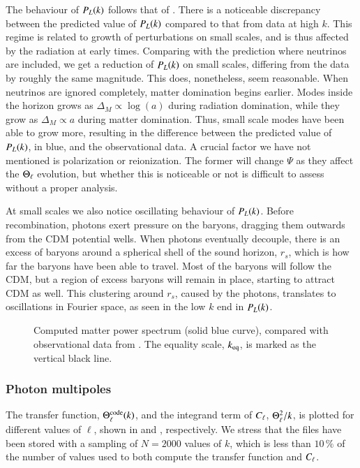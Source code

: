 The behaviour of $P_L(k)$ follows that of . There is a noticeable discrepancy between the predicted value of $P_L(k)$ compared to that from data at high $k$. This regime is related to growth of perturbations on small scales, and is thus affected by the radiation at early times. Comparing with the prediction where neutrinos are included, we get a reduction of $P_L(k)$ on small scales, differing from the data by roughly the same magnitude. This does, nonetheless, seem reasonable. When neutrinos are ignored completely, matter domination begins earlier. Modes inside the horizon grows as $\Delta_M\propto\log(a)$ during radiation domination, while they grow as $\Delta_M\propto a$ during matter domination. Thus, small scale modes have been able to grow more, resulting in the difference between the predicted value of $P_L(k)$, in blue, and the observational data. A crucial factor we have not mentioned is polarization or reionization. The former will change $\Psi$ as they affect the $\Theta_\ell$ evolution, but whether this is noticeable or not is difficult to assess without a proper analysis.

At small scales we also notice oscillating behaviour of $P_L(k)$. Before recombination, photons exert pressure on the baryons, dragging them outwards from the CDM potential wells. When photons eventually decouple, there is an excess of baryons around a spherical shell of the sound horizon, $r_s$, which is how far the baryons have been able to travel. Most of the baryons will follow the CDM, but a region of excess baryons will remain in place, starting to attract CDM as well. This clustering around $r_s$, caused by the photons, translates to oscillations in Fourier space, as seen in the low $k$ end in $P_L(k)$. 
\begin{figure}[ht!]
    \caption{Computed matter power spectrum (solid blue curve), compared with observational data from . The equality scale, $k_\mathrm{eq}$, is marked as the vertical black line.}
    \label{fig:M4:results:matterPS_nk2000Neff}
\end{figure}





\subsubsection{Photon multipoles} \label{sssec:M4:results:photons_multipoles}
The transfer function, $\Theta_\ell^\mathrm{code}(k)$, and the integrand term of $C_\ell$, $\Theta_\ell^2/k$, is plotted for different values of $\ell$, shown in  and , respectively. We stress that the files have been stored with a sampling of $N=2000$ values of $k$, which is less than $10\,\%$ of the number of values used to both compute the transfer function and $C_\ell$.  

